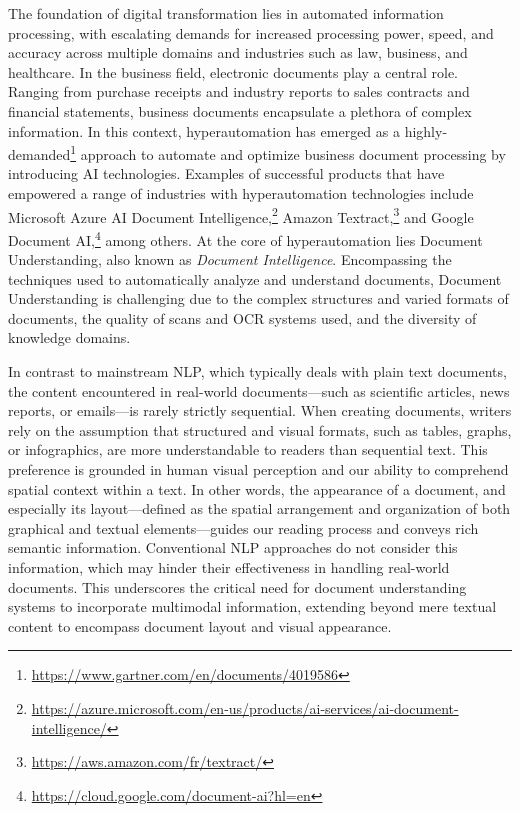 The foundation of digital transformation lies in automated information processing, with escalating demands for increased processing power, speed, and accuracy across multiple domains and industries such as law, business, and healthcare. In the business field, electronic documents play a central role. Ranging from purchase receipts and industry reports to sales contracts and financial statements, business documents encapsulate a plethora of complex information. In this context, hyperautomation has emerged as a highly-demanded\footnote{\url{https://www.gartner.com/en/documents/4019586}} approach to automate and optimize business document processing by introducing \ac{AI} technologies. Examples of successful products that have empowered a range of industries with hyperautomation technologies include Microsoft Azure AI Document Intelligence,\footnote{\url{https://azure.microsoft.com/en-us/products/ai-services/ai-document-intelligence/}} Amazon Textract,\footnote{\url{https://aws.amazon.com/fr/textract/}} and Google Document AI,\footnote{\url{https://cloud.google.com/document-ai?hl=en}} among others. At the core of hyperautomation lies Document Understanding, also known as \textit{Document Intelligence}. Encompassing the techniques used to automatically analyze and understand documents, Document Understanding is challenging due to the complex structures and varied formats of documents, the quality of scans and \ac{OCR} systems used, and the diversity of knowledge domains.

In contrast to mainstream \ac{NLP}, which typically deals with plain text documents, the content encountered in real-world documents—such as scientific articles, news reports, or emails—is rarely strictly sequential. When creating documents, writers rely on the assumption that structured and visual formats, such as tables, graphs, or infographics, are more understandable to readers than sequential text. This preference is grounded in human visual perception and our ability to comprehend spatial context within a text. In other words, the appearance of a document, and especially its layout—defined as the spatial arrangement and organization of both graphical and textual elements—guides our reading process and conveys rich semantic information. Conventional \ac{NLP} approaches do not consider this information, which may hinder their effectiveness in handling real-world documents. This underscores the critical need for document understanding systems to incorporate multimodal information, extending beyond mere textual content to encompass document layout and visual appearance.

